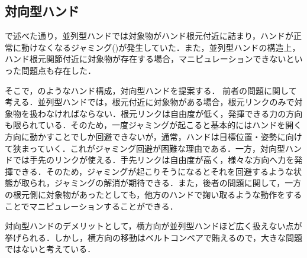 \documentclass[a4paper,twoside,12pt,papersize, dvipdfmx]{iirthesis}
\begin{document}
\subsection{対向型ハンド}\label{subsec::sicm::oppositehand}
で述べた通り，並列型ハンドでは対象物がハンド根元付近に詰まり，ハンドが正常に動けなくなるジャミング()が発生していた．また，並列型ハンドの構造上，ハンド根元関節付近に対象物が存在する場合，マニピュレーションできないといった問題点も存在した．\par
そこで，のようなハンド構成，対向型ハンドを提案する．
前者の問題に関して考える．並列型ハンドでは，根元付近に対象物がある場合，根元リンクのみで対象物を扱わなければならない．根元リンクは自由度が低く，発揮できる力の方向も限られている．そのため，一度ジャミングが起こると基本的にはハンドを開く方向に動かすことでしか回避できないが，通常，ハンドは目標位置・姿勢に向けて狭まっていく．これがジャミング回避が困難な理由である．一方，対向型ハンドでは手先のリンクが使える．手先リンクは自由度が高く，様々な方向へ力を発揮できる．そのため，ジャミングが起こりそうになるとそれを回避するような状態が取られ，ジャミングの解消が期待できる．また，後者の問題に関して，一方の根元側に対象物があったとしても，他方のハンドで掬い取るような動作をすることでマニピュレーションすることができる．\par
対向型ハンドのデメリットとして，横方向が並列型ハンドほど広く扱えない点が挙げられる．しかし，横方向の移動はベルトコンベアで賄えるので，大きな問題ではないと考えている．
\end{document}

